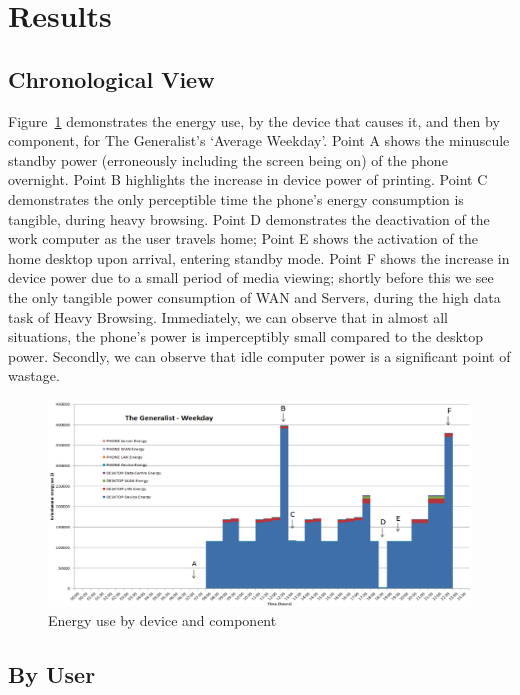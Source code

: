\documentclass[conference]{IEEEtran}
\begin{document}
\section{Results}

\subsection{Chronological View}

Figure~\ref{fig:generalist_weekday} demonstrates the energy use, by
the device that causes it, and then by component, for The Generalist’s
`Average Weekday'. Point A shows the minuscule standby power
(erroneously including the screen being on) of the phone
overnight. Point B highlights the increase in device power of
printing. Point C demonstrates the only perceptible time the phone’s
energy consumption is tangible, during heavy browsing. Point D
demonstrates the deactivation of the work computer as the user travels
home; Point E shows the activation of the home desktop upon arrival,
entering standby mode. Point F shows the increase in device power due
to a small period of media viewing; shortly before this we see the
only tangible power consumption of WAN and Servers, during the high
data task of Heavy Browsing. Immediately, we can observe that in
almost all situations, the phone’s power is imperceptibly small
compared to the desktop power. Secondly, we can observe that idle
computer power is a significant point of wastage.

\begin{figure}[!htp]
\centering
\includegraphics[width=0.9\columnwidth]{images/generalist_weekday.png}
\caption{Energy use by device and component}
\label{fig:generalist_weekday} 
\end{figure}

\subsection{By User}
\end{document}
